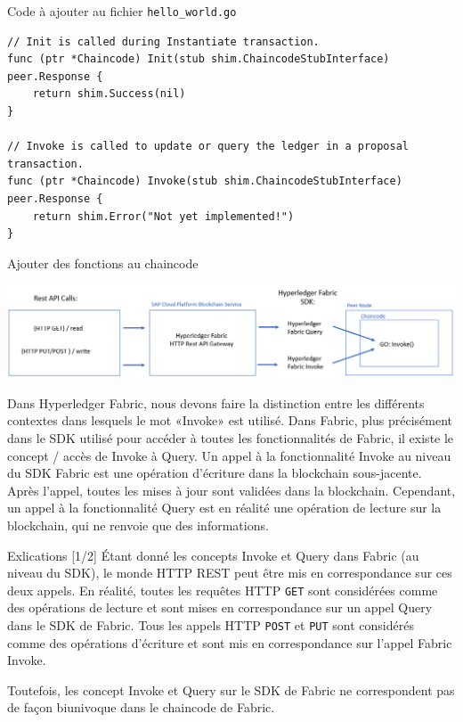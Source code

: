 \documentclass[presentation]{beamer}
\begin{document}
\begin{frame}[fragile,label={sec:orgb34e5a7}]{Code à ajouter au fichier \texttt{hello\_world.go}}
 \begin{verbatim}
// Init is called during Instantiate transaction.
func (ptr *Chaincode) Init(stub shim.ChaincodeStubInterface) peer.Response {
	return shim.Success(nil)
}

// Invoke is called to update or query the ledger in a proposal transaction.
func (ptr *Chaincode) Invoke(stub shim.ChaincodeStubInterface) peer.Response {
	return shim.Error("Not yet implemented!")
}
\end{verbatim}
\end{frame}
\begin{frame}[label={sec:orgcc701c5}]{Ajouter des fonctions au chaincode}
\begin{center}
\includegraphics[width=.9\linewidth]{./rest_api_calls.png}
\end{center}

Dans Hyperledger Fabric, nous devons faire la distinction entre les différents contextes dans lesquels
le mot «Invoke» est utilisé. 
Dans Fabric, plus précisément dans le SDK utilisé pour accéder à toutes les fonctionnalités de Fabric, 
il existe le concept / accès de Invoke à Query. 
Un appel à la fonctionnalité Invoke au niveau du SDK Fabric est une opération 
d'écriture dans la blockchain sous-jacente. 
Après l'appel, toutes les mises à jour sont validées dans la blockchain. 
Cependant, un appel à la fonctionnalité Query est en réalité une opération de lecture sur la blockchain, 
qui ne renvoie que des informations.
\end{frame}

\begin{frame}[fragile,label={sec:org624ce69}]{Exlications [1/2]}
 Étant donné les concepts Invoke et Query dans Fabric (au niveau du SDK), 
le monde HTTP REST peut être mis en correspondance sur ces deux appels. 
En réalité, toutes les requêtes HTTP \texttt{GET} sont considérées comme des 
opérations de lecture et sont mises en correspondance sur un appel Query dans le SDK de Fabric. 
Tous les appels HTTP \texttt{POST} et \texttt{PUT} sont considérés comme des opérations d'écriture et sont
mis en correspondance sur l'appel Fabric Invoke.

Toutefois, les concept Invoke et Query sur le SDK de Fabric ne correspondent pas de façon biunivoque
dans le chaincode de Fabric. 
\end{frame}
\end{document}

